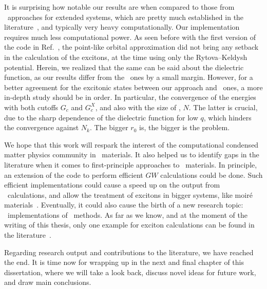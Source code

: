 It is surprising how notable our results are when compared to those from \abinit~approaches for extended systems, which are pretty much established in the literature~\cite{BerkeleyGW,GPAW_2025,Yambo_2009,Siesta_2020,Abinit_2016,Prandini_Galante_Marzari_Umari_2019}, and typically very heavy computationally.
Our implementation requires much less computational power.
As seen before with the first version of the code in Ref.~\cite{Xatu}, the point-like orbital approximation did not bring any setback in the calculation of the excitons, at the time using only the Rytova--Keldysh potential.
Herein, we realized that the same can be said about the dielectric function, as our results differ from the \abinit~ones by a small margin.
However, for a better agreement for the excitonic states between our approach and \abinit~ones, a more in-depth study should be in order.
In particular, the convergence of the energies with both cutoffs $G_c$ and $G^{X}_c$, and also with the size of \bz, $N$.
The latter is crucial, due to the sharp dependence of the dielectric function for low $q$, which hinders the convergence against $N_{k}$.
The bigger $r_0$ is, the bigger is the problem.

We hope that this work will respark the interest of the computational condensed matter physics community in \bd~materials.
It also helped us to identify gaps in the literature when it comes to first-principle approaches to \bd~materials.
In principle, an extension of the code to perform efficient $GW$ calculations could be done.
Such efficient implementations could cause a speed up on the output from \abinit~calculations, and allow the treatment of excitons in bigger systems, like moir\'e materials~\cite{Taboada_2023}.
Eventually, it could also cause the birth of a new research topic: \bd~implementations of \abinit~methods.
As far as we know, and at the moment of the writing of this thesis, only one example for exciton calculations can be found in the literature~\cite{Toni_Juanjo_2025}.

Regarding research output and contributions to the literature, we have reached the end.
It is time now for wrapping up in the next and final chapter of this dissertation, where we will take a look back, discuss novel ideas for future work, and draw main conclusions.
